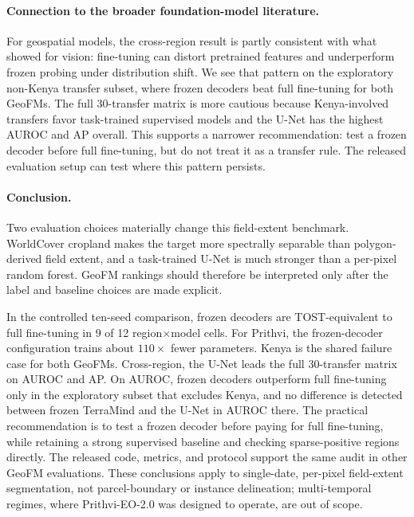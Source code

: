 \documentclass{article}
\begin{document}
\paragraph{Connection to the broader foundation-model literature.} For geospatial models, the cross-region result is partly consistent with what
\citet{kumar2022finetuning} showed for vision: fine-tuning can distort pretrained
features and underperform frozen probing under distribution shift. We see that
pattern on the exploratory non-Kenya transfer subset, where frozen decoders beat full
fine-tuning for both GeoFMs. The full 30-transfer matrix is more cautious because
Kenya-involved transfers favor task-trained supervised models and the U-Net has the
highest AUROC and AP overall. This supports a narrower recommendation: test a frozen decoder
before full fine-tuning, but do not treat it as a transfer rule. The released
evaluation setup can test where this pattern persists.

\paragraph{Conclusion.} Two evaluation choices materially change this field-extent
benchmark. WorldCover cropland makes the target more spectrally separable than
polygon-derived field extent, and a task-trained U-Net is much stronger than a per-pixel
random forest. GeoFM rankings should therefore be interpreted only after the label and
baseline choices are made explicit.

In the controlled ten-seed comparison, frozen decoders are TOST-equivalent to full
fine-tuning in 9 of 12 region$\times$model cells. For Prithvi, the frozen-decoder
configuration trains about $110\times$ fewer parameters. Kenya is the shared failure case for both GeoFMs. Cross-region, the U-Net leads
the full 30-transfer matrix on AUROC and AP. On AUROC, frozen decoders outperform full fine-tuning only in the
exploratory subset that excludes Kenya, and no difference is detected between frozen
TerraMind and the U-Net in AUROC there. The practical recommendation is to test a frozen decoder
before paying for full fine-tuning, while retaining a strong supervised baseline and
checking sparse-positive regions directly. The released code, metrics, and protocol support
the same audit in other GeoFM evaluations. These conclusions apply to single-date,
per-pixel field-extent segmentation, not parcel-boundary or instance delineation;
multi-temporal regimes, where Prithvi-EO-2.0 was designed to operate, are out of scope.
\end{document}
